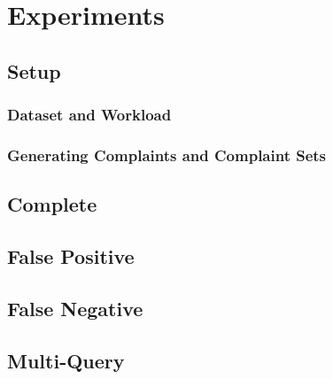 \section{Experiments}

\subsection{Setup}

\subsubsection{Dataset and Workload}

\subsubsection{Generating Complaints and Complaint Sets}

\subsection{Complete}

\subsection{False Positive}

\subsection{False Negative}

\subsection{Multi-Query}



